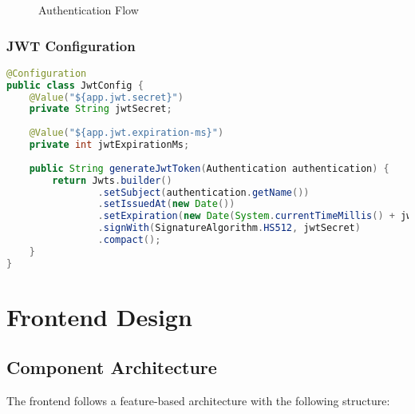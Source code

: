 \documentclass[12pt,a4paper]{article}
\begin{document}
\begin{figure}[H]
\centering
{}
\caption{Authentication Flow}
\label{fig:authentication-flow}
\end{figure}

\subsubsection{JWT Configuration}
\begin{lstlisting}[language=Java, caption=JWT Configuration]
@Configuration
public class JwtConfig {
    @Value("${app.jwt.secret}")
    private String jwtSecret;
    
    @Value("${app.jwt.expiration-ms}")
    private int jwtExpirationMs;
    
    public String generateJwtToken(Authentication authentication) {
        return Jwts.builder()
                .setSubject(authentication.getName())
                .setIssuedAt(new Date())
                .setExpiration(new Date(System.currentTimeMillis() + jwtExpirationMs))
                .signWith(SignatureAlgorithm.HS512, jwtSecret)
                .compact();
    }
}
\end{lstlisting}

\section{Frontend Design}

\subsection{Component Architecture}

The frontend follows a feature-based architecture with the following structure:
\end{document}
